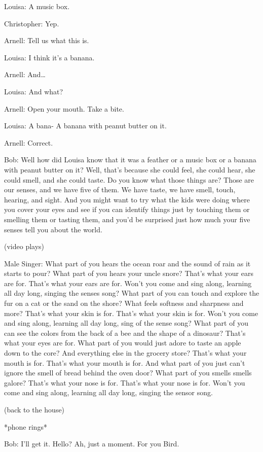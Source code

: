 Louisa: A music box.

Christopher: Yep.

Arnell: Tell us what this is.

Louisa: I think it's a banana.

Arnell: And\dots

Louisa: And what?

Arnell: Open your mouth. Take a bite.

Louisa: A bana- A banana with peanut butter on it.

Arnell: Correct.

Bob: Well how did Louisa know that it was a feather or a music box or a banana with peanut butter on it? Well, that's because she could feel, she could hear, she could smell, and she could taste. Do you know what those things are? Those are our senses, and we have five of them. We have taste, we have smell, touch, hearing, and sight. And you might want to try what the kids were doing where you cover your eyes and see if you can identify things just by touching them or smelling them or tasting them, and you'd be surprised just how much your five senses tell you about the world.

(video plays)

Male Singer: What part of you hears the ocean roar and the sound of rain as it starts to pour? What part of you hears your uncle snore? That's what your ears are for. That's what your ears are for. Won't you come and sing along, learning all day long, singing the senses song? What part of you can touch and explore the fur on a cat or the sand on the shore? What feels softness and sharpness and more? That's what your skin is for. That's what your skin is for. Won't you come and sing along, learning all day long, sing of the sense song? What part of you can see the colors from the back of a bee and the shape of a dinosaur? That's what your eyes are for. What part of you would just adore to taste an apple down to the core? And everything else in the grocery store? That's what your mouth is for. That's what your mouth is for. And what part of you just can't ignore the smell of bread behind the oven door? What part of you smells smells galore? That's what your nose is for. That's what your nose is for. Won't you come and sing along, learning all day long, singing the sensor song.

(back to the house)

*phone rings*

Bob: I'll get it. Hello? Ah, just a moment. For you Bird.

